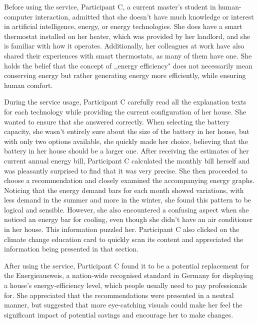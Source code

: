 Before using the service, 
Participant C, a current master's student in human-computer interaction, 
admitted that she doesn't have much knowledge or interest in artificial intelligence, energy, or energy technologies. 
She does have a smart thermostat installed on her heater, which was provided by her landlord, and she is familiar with how it operates. 
Additionally, her colleagues at work have also shared their experiences with smart thermostats, as many of them have one. 
She holds the belief that the concept of ,,energy efficiency" does not necessarily mean conserving energy but rather generating energy more efficiently, while ensuring human comfort.

During the service usage, 
Participant C carefully read all the explanation texts for each technology while providing the current configuration of her house. 
She wanted to ensure that she answered correctly. 
When selecting the battery capacity, she wasn't entirely sure about the size of the battery in her house, but with only two options available, she quickly made her choice, believing that the battery in her house should be a larger one.
After receiving the estimates of her current annual energy bill, Participant C calculated the monthly bill herself and was pleasantly surprised to find that it was very precise. 
She then proceeded to choose a recommendation and closely examined the accompanying energy graphs. 
Noticing that the energy demand bars for each month showed variations, with less demand in the summer and more in the winter, she found this pattern to be logical and sensible.
However, she also encountered a confusing aspect when she noticed an energy bar for cooling, even though she didn't have an air conditioner in her house. This information puzzled her. 
Participant C also clicked on the climate change education card to quickly scan its content and appreciated the information being presented in that section.

After using the service, 
Participant C found it to be a potential replacement for the Energieausweis, a nation-wide recognised standard in Germany for displaying a house's energy-efficiency level, which people usually need to pay professionals for. 
She appreciated that the recommendations were presented in a neutral manner, 
but suggested that more eye-catching visuals could make her feel the significant impact of potential savings and encourage her to make changes.

